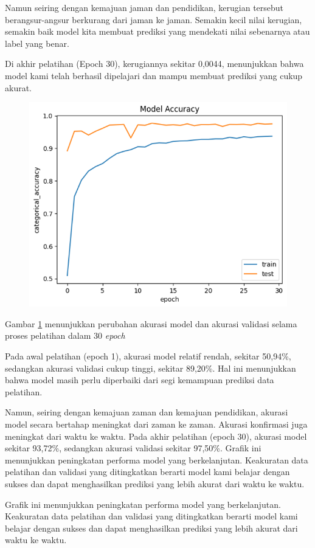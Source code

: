 Namun seiring dengan kemajuan jaman dan pendidikan, kerugian tersebut berangsur-angsur berkurang dari jaman ke jaman. Semakin kecil nilai kerugian, semakin baik model kita membuat prediksi yang mendekati nilai sebenarnya atau label yang benar.

Di akhir pelatihan (Epoch 30), kerugiannya sekitar 0,0044, menunjukkan bahwa model kami telah berhasil dipelajari dan mampu membuat prediksi yang cukup akurat. 

\begin{figure}[!hbt]
	\centering
	\includegraphics[width=0.7\linewidth]{gambar/bener/Accuracy_ModelCNN.png}
	\label{fig:AkurasiCNN1}
\end{figure}
Gambar \ref{fig:AkurasiCNN1} menunjukkan perubahan akurasi model dan akurasi validasi selama proses pelatihan dalam 30\textit{ epoch}

Pada awal pelatihan (epoch 1), akurasi model relatif rendah, sekitar 50,94\%, sedangkan akurasi validasi cukup tinggi, sekitar 89,20\%. Hal ini menunjukkan bahwa model masih perlu diperbaiki dari segi kemampuan prediksi data pelatihan.

Namun, seiring dengan kemajuan zaman dan kemajuan pendidikan, akurasi model secara bertahap meningkat dari zaman ke zaman. Akurasi konfirmasi juga meningkat dari waktu ke waktu. Pada akhir pelatihan (epoch 30), akurasi model sekitar 93,72\%, sedangkan akurasi validasi sekitar 97,50\%. Grafik ini menunjukkan peningkatan performa model yang berkelanjutan. Keakuratan data pelatihan dan validasi yang ditingkatkan berarti model kami belajar dengan sukses dan dapat menghasilkan prediksi yang lebih akurat dari waktu ke waktu.

Grafik ini menunjukkan peningkatan performa model yang berkelanjutan. Keakuratan data pelatihan dan validasi yang ditingkatkan berarti model kami belajar dengan sukses dan dapat menghasilkan prediksi yang lebih akurat dari waktu ke waktu.  

